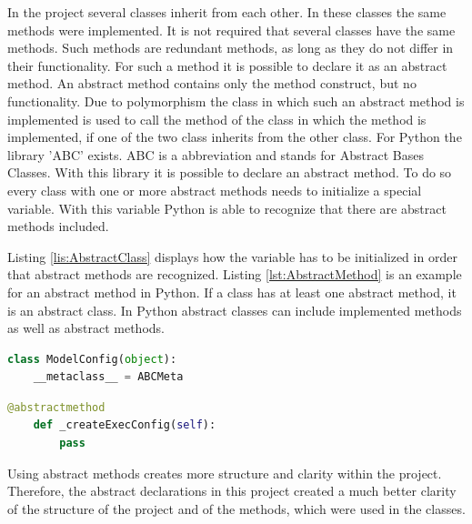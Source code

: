 In the project several classes inherit from each other. In these classes the same methods were implemented. It is not required that several classes have the same methods. Such methods are redundant methods, as long as they do not differ in their functionality. For such a method it is possible to declare it as an abstract method. An abstract method contains only the method construct, but no functionality. Due to polymorphism the class in which such an abstract method is implemented is used to call the method of the class in which the method is implemented, if one of the two class inherits from the other class. \newline
For Python the library 'ABC' exists. ABC is a abbreviation and stands for Abstract Bases Classes. With this library it is possible to declare an abstract method. To do so every class with one or more abstract methods needs to initialize a special variable. With this variable Python is able to recognize that there are abstract methods included. 

Listing \ref{lis:AbstractClass} displays how the variable has to be initialized in order that abstract methods are recognized. Listing \ref{lst:AbstractMethod} is an example for an abstract method in Python. If a class has at least one abstract method, it is an abstract class. In Python abstract classes can include implemented methods as well as abstract methods.

\begin{lstlisting}[language=Python, caption ={[Initialization of an class variable in order to use the library ABC] The initialization of a class variable which is required by Python in order to detect abstract methods and abstract classes.}, label = lis:AbstractClass]
class ModelConfig(object):
    __metaclass__ = ABCMeta
\end{lstlisting} 

\begin{lstlisting}[language=Python, caption ={[Declaration of an abstract method] Declaration of an abstract method.}, label=lst:AbstractMethod]
    @abstractmethod
    def _createExecConfig(self):
        pass
\end{lstlisting}
Using abstract methods creates more structure and clarity within the project. Therefore, the abstract declarations in this project created a much better clarity of the structure of the project and of the methods, which were used in the classes.

